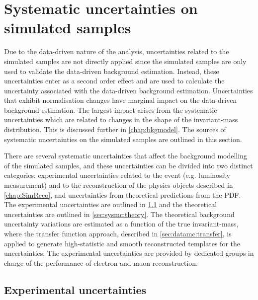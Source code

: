 \chapter{Systematic uncertainties on simulated samples}\label{chap:sysmc}

Due to the data-driven nature of the analysis, uncertainties related to the simulated samples are not directly applied since the simulated samples are only used to validate the data-driven background estimation. Instead, these uncertainties enter as a second order effect and are used to calculate the uncertainty associated with the data-driven background estimation. Uncertainties that exhibit normalisation changes have marginal impact on the data-driven background estimation. The largest impact arises from the systematic uncertainties which are related to changes in the shape of the invariant-mass distribution. This is discussed further in \cref{chap:bkgmodel}. The sources of systematic uncertainties on the simulated samples are outlined in this section. 

There are several systematic uncertainties that affect the background modelling of the simulated samples, and these uncertainties can be divided into two distinct categories: experimental uncertainties related to the event (e.g. luminosity measurement) and to the reconstruction of the physics objects described in \cref{chap:SimReco}, and uncertainties from theoretical predictions from the PDF. The experimental uncertainties are outlined in \cref{sec:sysmc:exp} and the theoretical uncertainties are outlined in \cref{sec:sysmc:theory}. The theoretical background uncertainty variations are estimated as a function of the true invariant-mass, where the transfer function approach, described in \cref{sec:datamc:transfer}, is applied to generate high-statistic and smooth reconstructed templates for the uncertainties. The experimental uncertainties are provided by dedicated groups in charge of the performance of electron and muon reconstruction.

\section{Experimental uncertainties}\label{sec:sysmc:exp}

